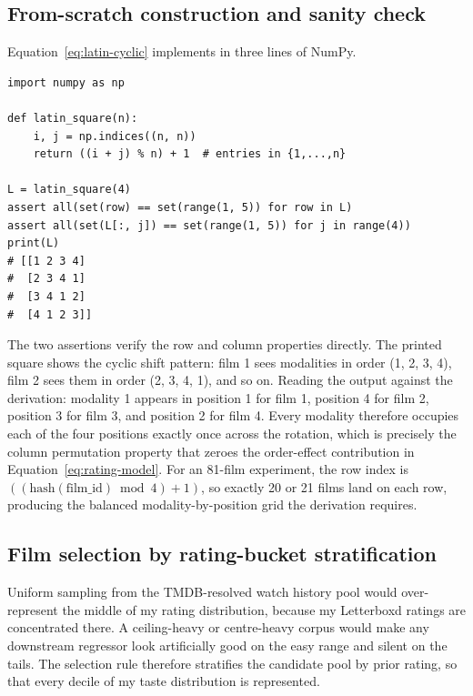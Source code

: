 \documentclass{article}
\begin{document}
\subsection{From-scratch construction and sanity check}

Equation~\ref{eq:latin-cyclic} implements in three lines of NumPy.

\begin{lstlisting}[caption={Cyclic Latin square constructor with row and column checks.}]
import numpy as np

def latin_square(n):
    i, j = np.indices((n, n))
    return ((i + j) % n) + 1  # entries in {1,...,n}

L = latin_square(4)
assert all(set(row) == set(range(1, 5)) for row in L)
assert all(set(L[:, j]) == set(range(1, 5)) for j in range(4))
print(L)
# [[1 2 3 4]
#  [2 3 4 1]
#  [3 4 1 2]
#  [4 1 2 3]]
\end{lstlisting}

The two assertions verify the row and column properties directly. The printed square shows the cyclic shift pattern: film 1 sees modalities in order (1, 2, 3, 4), film 2 sees them in order (2, 3, 4, 1), and so on. Reading the output against the derivation: modality 1 appears in position 1 for film 1, position 4 for film 2, position 3 for film 3, and position 2 for film 4. Every modality therefore occupies each of the four positions exactly once across the rotation, which is precisely the column permutation property that zeroes the order-effect contribution in Equation~\ref{eq:rating-model}. For an 81-film experiment, the row index is $((\text{hash}(\text{film\_id}) \bmod 4) + 1)$, so exactly 20 or 21 films land on each row, producing the balanced modality-by-position grid the derivation requires.

\subsection{Film selection by rating-bucket stratification}
\label{subsec:film-selection}

Uniform sampling from the TMDB-resolved watch history pool would over-represent the middle of my rating distribution, because my Letterboxd ratings are concentrated there. A ceiling-heavy or centre-heavy corpus would make any downstream regressor look artificially good on the easy range and silent on the tails. The selection rule therefore stratifies the candidate pool by prior rating, so that every decile of my taste distribution is represented.
\end{document}

